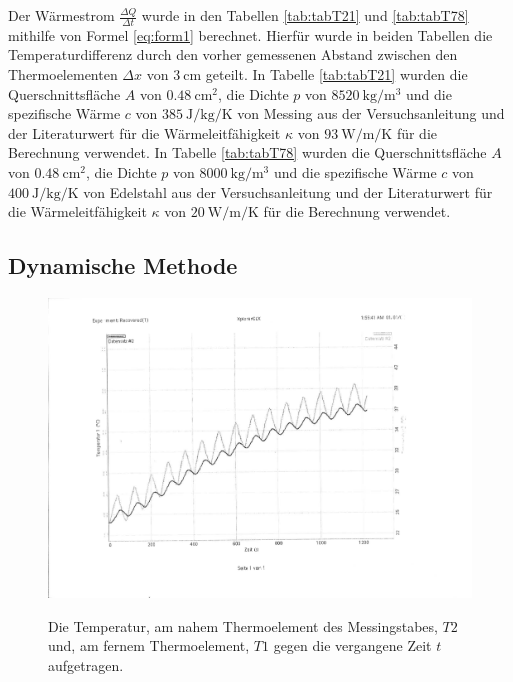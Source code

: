 Der Wärmestrom $\frac{\Delta Q}{\Delta t}$ wurde in den Tabellen \ref{tab:tabT21} und \ref{tab:tabT78} mithilfe von Formel \eqref{eq:form1} berechnet. Hierfür wurde in beiden Tabellen die Temperaturdifferenz durch den vorher gemessenen Abstand zwischen den Thermoelementen $\Delta x$ von $\SI{3}{\centi\meter}$ geteilt. In Tabelle \ref{tab:tabT21} wurden die Querschnittsfläche $A$ von $\SI{0.48}{\centi\meter\squared}$, die Dichte $p$ von $\SI{8520}{\kilo\gram\per\meter\tothe{3}}$ und die spezifische Wärme $c$ von $\SI{385}{\joule\per\kilo\gram\per\kelvin}$ von Messing aus der Versuchsanleitung \cite{V204} und der Literaturwert für die Wärmeleitfähigkeit $\kappa$ von $\SI{93}{\watt\per\meter\per\kelvin}$ \cite{??} für die Berechnung verwendet.
In Tabelle \ref{tab:tabT78} wurden die Querschnittsfläche $A$ von $\SI{0.48}{\centi\meter\squared}$, die Dichte $p$ von $\SI{8000}{\kilo\gram\per\meter\tothe{3}}$ und die spezifische Wärme $c$ von $\SI{400}{\joule\per\kilo\gram\per\kelvin}$ von Edelstahl aus der Versuchsanleitung \cite{V204} und der Literaturwert für die Wärmeleitfähigkeit $\kappa$ von $\SI{20}{\watt\per\meter\per\kelvin}$ \cite{??} für die Berechnung verwendet. 
\subsection{Dynamische Methode}
\begin{figure}
	\centering
	\caption{Die Temperatur, am nahem Thermoelement des Messingstabes, $T2$ und, am fernem Thermoelement, $T1$ gegen die vergangene Zeit $t$ aufgetragen.}
	\includegraphics[width=\linewidth-70pt,height=\textheight-70pt,keepaspectratio]{content/Bilder/T1T2-rotated.pdf}
	\label{fig:Graph5}
\end{figure}
\begin{table}
	\centering
	\caption{Die aus dem Graphen in Abbildung \ref{fig:Graph5} entnommenen Werte für die Phasendifferenz $\Delta t$ die Amplitude am nahem Thermoelement des breitem Messingstabes $A_\text{nah}$ und am fernem Thermoelement $A_\text{fern}$.}
	
\end{table}

